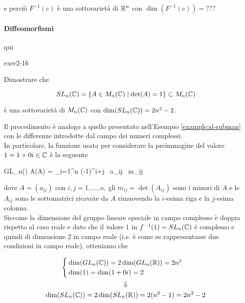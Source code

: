 {e perciò $ F^{-1}(c) $ è una sottovarietà di $ \mathbb{R}^{n} $ con $ \dim(F^{-1}(c)) = ??? $

\paragraph{Diffeomorfismi}

qui
}


{exer2-16}
{
Dimostrare che

\begin{equation}
	SL_{n}(\mathbb{C}) = \{ A \in M_{n}(\mathbb{C}) \mid \det(A) = 1 \} \subset M_{n}(\mathbb{C})
\end{equation}

è una sottovarietà di $ M_{n}(\mathbb{C}) $ con $ \dim(SL_{n}(\mathbb{C})) = 2 n^{2} - 2 $.
}
{
Il procedimento è analogo a quello presentato nell'Esempio \ref{example:sl-subman} con le differenze introdotte dal campo dei numeri complessi. \\
In particolare, la funzione usata per considerare la preimmagine del valore $ 1 = 1 + 0 i \in \mathbb{C} $ è la seguente

	{GL_{n}(\C)}{\C}
	{A}{\det(A) = \sum_{i=1}^{n} (-1)^{i+j} \, a_{ij} \, m_{ij}}

dove $ A = (a_{ij}) $ con $ i,j=1,\dots,n $, gli $ m_{ij} = \det(A_{ij}) $ sono i minori di $ A $ e le $ A_{ij} $ sono le sottomatrici ricavate da $ A $ rimuovendo la $ i $-esima riga e la $ j $-esima colonna. \\
Siccome la dimensione del gruppo lineare speciale in campo complesso è doppia rispetto al caso reale e dato che il valore $ 1 $ in $ f^{-1}(1) = SL_{n}(\mathbb{C}) $ è complesso e quindi di dimensione 2 in campo reale (i.e. è come se rappresentasse due condizioni in campo reale), otteniamo che

\begin{gather}
	\begin{cases}
		\dim(GL_{n}(\C)) = 2 \dim(GL_{n}(\R)) = 2 n^{2} \\
		\dim(1) = \dim(1 + 0 i) = 2
	\end{cases} \nonumber \\
	\Downarrow \\ %
	\dim(SL_{n}(\C)) = 2 \dim(SL_{n}(\R)) = 2(n^{2} - 1) = 2 n^{2} - 2 \nonumber
\end{gather}
}



